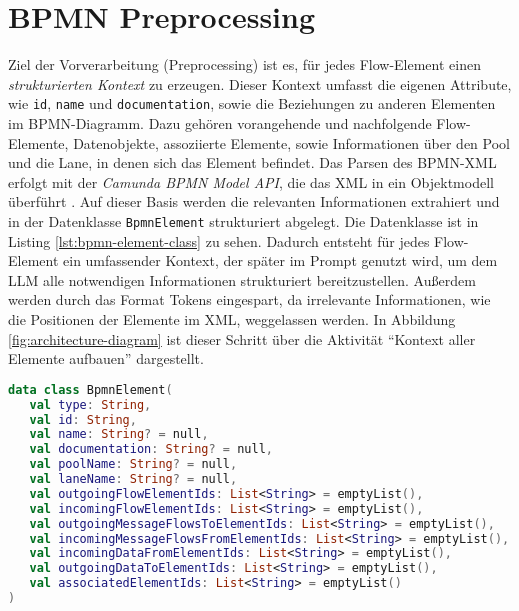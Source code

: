 \section{BPMN Preprocessing}\label{sec:bpmn-preprocessing}

Ziel der Vorverarbeitung (Preprocessing) ist es, für jedes Flow-Element einen \emph{strukturierten Kontext} zu erzeugen. Dieser Kontext umfasst die eigenen Attribute, wie \texttt{id}, \texttt{name} und \texttt{documentation}, sowie die Beziehungen zu anderen Elementen im \ac{BPMN}-Diagramm. Dazu gehören vorangehende und nachfolgende Flow-Elemente, Datenobjekte, assoziierte Elemente, sowie Informationen über den Pool und die Lane, in denen sich das Element befindet. Das Parsen des \ac{BPMN}-XML erfolgt mit der \emph{Camunda BPMN Model API}, die das XML in ein Objektmodell überführt \cite{camunda-bpmn-model-api, camunda-bpmn-model-read}. Auf dieser Basis werden die relevanten Informationen extrahiert und in der Datenklasse \texttt{BpmnElement} strukturiert abgelegt. Die Datenklasse ist in Listing \ref{lst:bpmn-element-class} zu sehen. Dadurch entsteht für jedes Flow-Element ein umfassender Kontext, der später im Prompt genutzt wird, um dem \ac{LLM} alle notwendigen Informationen strukturiert bereitzustellen. Außerdem werden durch das Format Tokens eingespart, da irrelevante Informationen, wie die Positionen der Elemente im XML, weggelassen werden. In Abbildung \ref{fig:architecture-diagram} ist dieser Schritt über die Aktivität \enquote{Kontext aller Elemente aufbauen} dargestellt.

\begin{lstlisting}[language=Kotlin,caption={Interne \ac{BPMN}-Repräsentation je Flow-Element.},label={lst:bpmn-element-class}]
data class BpmnElement(
   val type: String,
   val id: String,
   val name: String? = null,
   val documentation: String? = null,
   val poolName: String? = null,
   val laneName: String? = null,
   val outgoingFlowElementIds: List<String> = emptyList(),
   val incomingFlowElementIds: List<String> = emptyList(),
   val outgoingMessageFlowsToElementIds: List<String> = emptyList(),
   val incomingMessageFlowsFromElementIds: List<String> = emptyList(),
   val incomingDataFromElementIds: List<String> = emptyList(),
   val outgoingDataToElementIds: List<String> = emptyList(),
   val associatedElementIds: List<String> = emptyList()
)
\end{lstlisting}